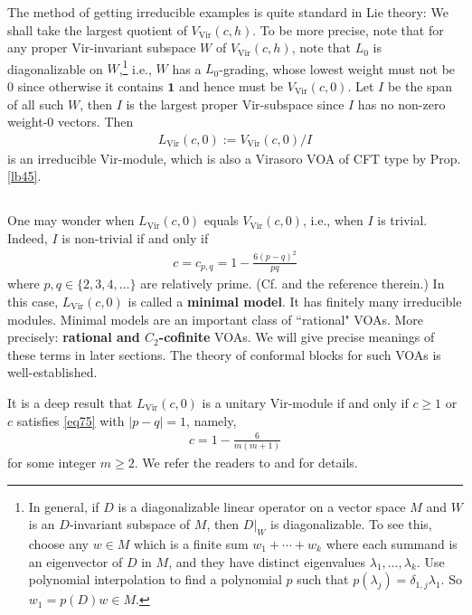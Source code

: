 \documentclass[11pt,b5paper,notitlepage]{article}
\theoremstyle{definition}
\theoremstyle{plain}
\newcommand{\id}{\mathbf{1}}
\newcommand{\Vir}{\mathrm{Vir}}
\numberwithin{equation}{section}
\begin{document}
The method of getting irreducible examples is quite standard in Lie theory: We shall take the largest quotient of $V_\Vir(c,h)$. To be more precise, note that for any proper $\Vir$-invariant subspace $W$ of $V_\Vir(c,h)$, note that $L_0$ is diagonalizable on $W$,\footnote{In general, if $D$ is a diagonalizable linear operator on a vector space $M$ and $W$ is an $D$-invariant subspace of $M$, then $D|_W$ is diagonalizable. To see this, choose any $w\in M$ which is a finite sum $w_1+\cdots +w_k$ where each summand is an eigenvector of $D$ in $M$, and they have distinct eigenvalues $\lambda_1,\dots,\lambda_k$. Use polynomial interpolation to find a polynomial $p$ such that $p(\lambda_j)=\delta_{1,j}\lambda_1$.  So $w_1=p(D)w\in M$.} i.e., $W$ has a $L_0$-grading, whose lowest weight must not be $0$ since otherwise it contains $\id$ and hence must be $V_\Vir(c,0)$. Let $I$ be the span of all such $W$, then $I$ is the largest proper $\Vir$-subspace since $I$ has no non-zero weight-$0$ vectors. Then
\begin{align*}
L_\Vir(c,0):=V_\Vir(c,0)/I
\end{align*}
is an irreducible $\Vir$-module, which is also a Virasoro VOA of CFT type by Prop. \ref{lb45}.

\subsection{}


One may wonder when $L_\Vir(c,0)$ equals $V_\Vir(c,0)$, i.e., when $I$ is trivial. Indeed, $I$ is non-trivial if and only if
\begin{align}
c=c_{p,q}=1-\frac{6(p-q)^2}{pq}	\label{eq75}
\end{align}
where $p,q\in\{2,3,4,\dots\}$ are relatively prime. (Cf. \cite[Rem. 6.1.13]{LL} and the reference therein.) In this case, $L_\Vir(c,0)$ is called a \textbf{minimal model}. It has finitely many irreducible modules. Minimal models are an important class of ``rational" VOAs. More precisely: \textbf{rational and $C_2$-cofinite} VOAs. We will give precise meanings of these terms in later sections. The theory of conformal blocks for such VOAs is well-established.


It is a deep result that $L_\Vir(c,0)$ is a unitary $\Vir$-module if and only if $c\geq1$ or $c$ satisfies \eqref{eq75} with $|p-q|=1$, namely,
\begin{align}
	c=1-\frac 6{m(m+1)}\label{eq130}
\end{align}
for some integer $m\geq2$. We refer the readers to \cite[Chapter 8]{FMS} and \cite[Chapter IV]{Was10} for details.
\end{document}
